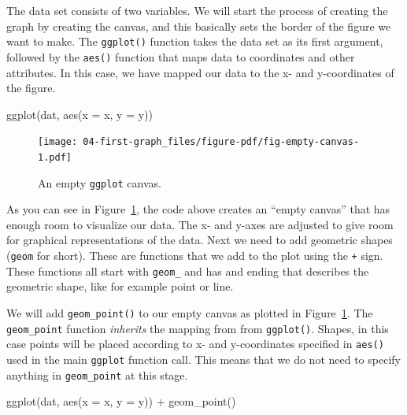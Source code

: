 \documentclass[
  11pt,
  letterpaper,
]{scrbook}
\newenvironment{Shaded}{\begin{snugshade}}{\end{snugshade}}
\newcommand{\AttributeTok}[1]{\textcolor[rgb]{0.40,0.45,0.13}{#1}}
\newcommand{\FunctionTok}[1]{\textcolor[rgb]{0.28,0.35,0.67}{#1}}
\newcommand{\NormalTok}[1]{\textcolor[rgb]{0.00,0.23,0.31}{#1}}
\newcommand{\SpecialCharTok}[1]{\textcolor[rgb]{0.37,0.37,0.37}{#1}}
\begin{document}
The data set consists of two variables. We will start the process of
creating the graph by creating the canvas, and this basically sets the
border of the figure we want to make. The \texttt{ggplot()} function
takes the data set as its first argument, followed by the \texttt{aes()}
function that maps data to coordinates and other attributes. In this
case, we have mapped our data to the x- and y-coordinates of the figure.

\begin{Shaded}
\begin{Highlighting}[numbers=left,,]
\FunctionTok{ggplot}\NormalTok{(dat, }\FunctionTok{aes}\NormalTok{(}\AttributeTok{x =}\NormalTok{ x, }\AttributeTok{y =}\NormalTok{ y))}
\end{Highlighting}
\end{Shaded}

\begin{figure}[H]

{\centering \texttt{[image: 04-first-graph\_files/figure-pdf/fig-empty-canvas-1.pdf]}

}

\caption{\label{fig-empty-canvas}An empty \texttt{ggplot} canvas.}

\end{figure}

As you can see in Figure~\ref{fig-empty-canvas}, the code above creates
an ``empty canvas'' that has enough room to visualize our data. The x-
and y-axes are adjusted to give room for graphical representations of
the data. Next we need to add geometric shapes (\texttt{geom} for
short). These are functions that we add to the plot using the \texttt{+}
sign. These functions all start with \texttt{geom\_} and has and ending
that describes the geometric shape, like for example point or line.

We will add \texttt{geom\_point()} to our empty canvas as plotted in
Figure~\ref{fig-empty-canvas}. The \texttt{geom\_point} function
\emph{inherits} the mapping from from \texttt{ggplot()}. Shapes, in this
case points will be placed according to x- and y-coordinates specified
in \texttt{aes()} used in the main \texttt{ggplot} function call. This
means that we do not need to specify anything in \texttt{geom\_point} at
this stage.

\begin{Shaded}
\begin{Highlighting}[numbers=left,,]
\FunctionTok{ggplot}\NormalTok{(dat, }\FunctionTok{aes}\NormalTok{(}\AttributeTok{x =}\NormalTok{ x, }\AttributeTok{y =}\NormalTok{ y)) }\SpecialCharTok{+} \FunctionTok{geom\_point}\NormalTok{()}
\end{Highlighting}
\end{Shaded}
\end{document}
